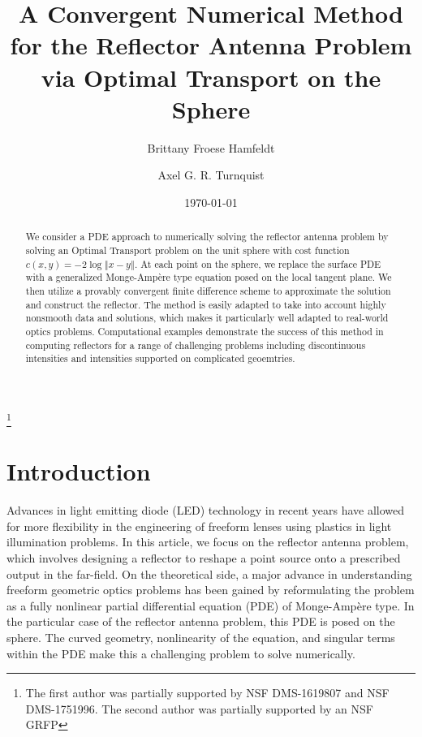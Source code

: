 \documentclass{amsart}
\theoremstyle{lemma}
\theoremstyle{remark}
\begin{document}
\title[Reflector Antenna Problem via Optimal Transport]{A Convergent Numerical Method for the Reflector Antenna Problem via Optimal Transport on the Sphere}


\author{Brittany Froese Hamfeldt}
\address{Department of Mathematical Sciences, New Jersey Institute of Technology, University Heights, Newark, NJ 07102}
\author{Axel G. R. Turnquist}
\address{Department of Mathematical Sciences, New Jersey Institute of Technology, University Heights, Newark, NJ 07102}


\thanks{The first author was partially supported by NSF DMS-1619807 and NSF DMS-1751996. The second author was partially supported by  an NSF GRFP}

\begin{abstract}
We consider a PDE approach to numerically solving the reflector antenna problem by solving an Optimal Transport problem on the unit sphere with cost function $c(x,y) = -2\log \left\Vert x - y \right\Vert$. At each point on the sphere, we replace the surface PDE with a generalized Monge-Amp\`ere type equation posed on the local tangent plane. We then utilize a provably convergent finite difference scheme to approximate the solution and construct the reflector. The method is easily adapted to take into account highly nonsmooth data and solutions, which makes it particularly well adapted to real-world optics problems.  Computational examples demonstrate the success of this method in computing reflectors for a range of challenging problems including discontinuous intensities and intensities supported on complicated geoemtries.
\end{abstract}


\date{\today}    
\maketitle
\section{Introduction}\label{sec:intro}
Advances in light emitting diode (LED) technology in recent years have allowed for more flexibility in the engineering of freeform lenses using plastics in light illumination problems. In this article, we focus on the reflector antenna problem, which involves designing a reflector to reshape a point source onto a prescribed output in the far-field.  
On the theoretical side, a major advance in understanding freeform geometric optics problems has been gained by reformulating the problem as a fully nonlinear partial differential equation (PDE) of Monge-Amp\`{e}re type. In the particular case of the reflector antenna problem, this PDE is posed on the sphere.  The curved geometry, nonlinearity of the equation, and singular terms within the PDE make this a challenging problem to solve numerically.  
\end{document}

